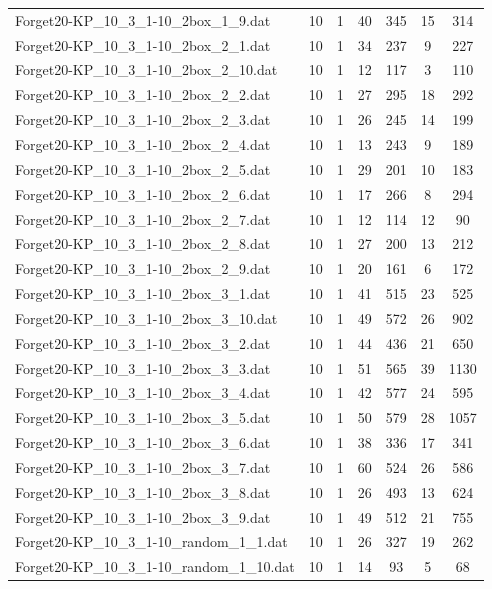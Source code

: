 \begin{table}[!ht]
\begin{tabular}{lcccccc}
Forget20-KP\_10\_3\_1-10\_2box\_1\_9.dat & 10 & 1 & 40 & 345 & 15 & 314 \\
Forget20-KP\_10\_3\_1-10\_2box\_2\_1.dat & 10 & 1 & 34 & 237 & 9 & 227 \\
Forget20-KP\_10\_3\_1-10\_2box\_2\_10.dat & 10 & 1 & 12 & 117 & 3 & 110 \\
Forget20-KP\_10\_3\_1-10\_2box\_2\_2.dat & 10 & 1 & 27 & 295 & 18 & 292 \\
Forget20-KP\_10\_3\_1-10\_2box\_2\_3.dat & 10 & 1 & 26 & 245 & 14 & 199 \\
Forget20-KP\_10\_3\_1-10\_2box\_2\_4.dat & 10 & 1 & 13 & 243 & 9 & 189 \\
Forget20-KP\_10\_3\_1-10\_2box\_2\_5.dat & 10 & 1 & 29 & 201 & 10 & 183 \\
Forget20-KP\_10\_3\_1-10\_2box\_2\_6.dat & 10 & 1 & 17 & 266 & 8 & 294 \\
Forget20-KP\_10\_3\_1-10\_2box\_2\_7.dat & 10 & 1 & 12 & 114 & 12 & 90 \\
Forget20-KP\_10\_3\_1-10\_2box\_2\_8.dat & 10 & 1 & 27 & 200 & 13 & 212 \\
Forget20-KP\_10\_3\_1-10\_2box\_2\_9.dat & 10 & 1 & 20 & 161 & 6 & 172 \\
Forget20-KP\_10\_3\_1-10\_2box\_3\_1.dat & 10 & 1 & 41 & 515 & 23 & 525 \\
Forget20-KP\_10\_3\_1-10\_2box\_3\_10.dat & 10 & 1 & 49 & 572 & 26 & 902 \\
Forget20-KP\_10\_3\_1-10\_2box\_3\_2.dat & 10 & 1 & 44 & 436 & 21 & 650 \\
Forget20-KP\_10\_3\_1-10\_2box\_3\_3.dat & 10 & 1 & 51 & 565 & 39 & 1130 \\
Forget20-KP\_10\_3\_1-10\_2box\_3\_4.dat & 10 & 1 & 42 & 577 & 24 & 595 \\
Forget20-KP\_10\_3\_1-10\_2box\_3\_5.dat & 10 & 1 & 50 & 579 & 28 & 1057 \\
Forget20-KP\_10\_3\_1-10\_2box\_3\_6.dat & 10 & 1 & 38 & 336 & 17 & 341 \\
Forget20-KP\_10\_3\_1-10\_2box\_3\_7.dat & 10 & 1 & 60 & 524 & 26 & 586 \\
Forget20-KP\_10\_3\_1-10\_2box\_3\_8.dat & 10 & 1 & 26 & 493 & 13 & 624 \\
Forget20-KP\_10\_3\_1-10\_2box\_3\_9.dat & 10 & 1 & 49 & 512 & 21 & 755 \\
Forget20-KP\_10\_3\_1-10\_random\_1\_1.dat & 10 & 1 & 26 & 327 & 19 & 262 \\
Forget20-KP\_10\_3\_1-10\_random\_1\_10.dat & 10 & 1 & 14 & 93 & 5 & 68 \\

\end{tabular}
\end{table}
